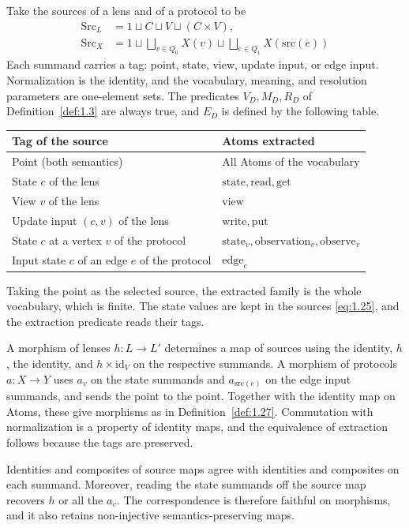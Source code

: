 \begin{construction}\label{cons:1.40}

Take the sources of a lens and of a protocol to be
\begin{equation*}
\begin{aligned}
\mathrm{Src}_L
&=1\sqcup C\sqcup V\sqcup(C\times V),\\
\mathrm{Src}_X
&=1\sqcup\bigsqcup_{v\in Q_0}X(v)
 \sqcup\bigsqcup_{e\in Q_1}X(\mathrm{src}(e))
\end{aligned}
\tag{1.25}\label{eq:1.25}
\end{equation*}
Each summand carries a tag: point, state, view, update input, or edge input.
Normalization is the identity, and the vocabulary, meaning, and resolution
parameters are one-element sets.
The predicates $V_D,M_D,R_D$ of Definition~\ref{def:1.3} are always true, and
$E_D$ is defined by the following table.

\begin{xltabular}{\linewidth}{@{}LL@{}}
\toprule
Tag of the source & Atoms extracted \\
\midrule
\endhead
Point (both semantics) & All Atoms of the vocabulary \\
\addlinespace[3pt]
State $c$ of the lens & $\mathrm{state},\mathrm{read},\mathrm{get}$ \\
\addlinespace[3pt]
View $v$ of the lens & $\mathrm{view}$ \\
\addlinespace[3pt]
Update input $(c,v)$ of the lens & $\mathrm{write},\mathrm{put}$ \\
\addlinespace[3pt]
State $c$ at a vertex $v$ of the protocol & $\mathrm{state}_v,\mathrm{observation}_v,\mathrm{observe}_v$ \\
\addlinespace[3pt]
Input state $c$ of an edge $e$ of the protocol & $\mathrm{edge}_e$ \\
\bottomrule
\end{xltabular}

Taking the point as the selected source, the extracted family is the whole
vocabulary, which is finite.
The state values are kept in the sources \eqref{eq:1.25}, and the extraction
predicate reads their tags.

A morphism of lenses $h:L\to L'$ determines a map of sources using the
identity, $h$, the identity, and $h\times\mathrm{id}_V$ on the respective
summands.
A morphism of protocols $a:X\to Y$ uses $a_v$ on the state summands and
$a_{\mathrm{src}(e)}$ on the edge input summands, and sends the point to the
point.
Together with the identity map on Atoms, these give morphisms as in
Definition~\ref{def:1.27}.
Commutation with normalization is a property of identity maps, and the
equivalence of extraction follows because the tags are preserved.

Identities and composites of source maps agree with identities and composites
on each summand.
Moreover, reading the state summands off the source map recovers $h$ or all
the $a_v$.
The correspondence is therefore faithful on morphisms, and it also retains
non-injective semantics-preserving maps.

\end{construction}

